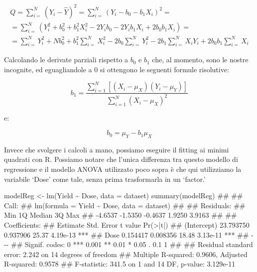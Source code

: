 \documentclass[a4paper,12pt,oneside]{book}
\newenvironment{Shaded}{\begin{snugshade}}{\end{snugshade}}
\newcommand{\SpecialCharTok}[1]{#1}
\newcommand{\DocumentationTok}[1]{#1}
\newcommand{\OtherTok}[1]{#1}
\newcommand{\FunctionTok}[1]{#1}
\newcommand{\AttributeTok}[1]{#1}
\newcommand{\NormalTok}[1]{#1}
\begin{document}
\[\begin{array}{l}
Q = \sum\limits_{i = }^N {\left( {{Y_i} - \hat Y} \right)^2 = \sum\limits_{i = }^N {{{\left( {{Y_i} - {b_0} - {b_1}{X_i}} \right)}^2}}  = } \\
 = \sum\limits_{i = }^N {\left( {Y_i^2 + b_0^2 + b_1^2X_i^2 - 2{Y_i}{b_0} - 2{Y_i}{b_1}{X_i} + 2{b_0}{b_1}{X_i}} \right)}  = \\
 = \sum\limits_{i = }^N {Y_i^2 + Nb_0^2 + b_1^2\sum\limits_{i = }^N {X_i^2 - 2{b_0}\sum\limits_{i = }^N {Y_i^2 - 2{b_1}\sum\limits_{i = }^N {{X_i}{Y_i} + } } } } 2{b_0}{b_1}\sum\limits_{i = }^N {{X_i}} 
\end{array}\]

Calcolando le derivate parziali rispetto a \(b_0\) e \(b_1\) che, al momento, sono le nostre incognite, ed eguagliandole a 0 si ottengono le seguenti formule risolutive:

\[{b_1} = \frac{{\sum\limits_{i = 1}^N {\left[ {\left( {{X_i} - {\mu _X}} \right)\left( {{Y_i} - {\mu _Y}} \right)} \right]} }}{{\sum\limits_{i = 1}^N {{{\left( {{X_i} - {\mu _X}} \right)}^2}} }}\]

e:

\[{b_0} = {\mu _Y} - {b_1}{\mu _X}\]

Invece che svolgere i calcoli a mano, possiamo eseguire il fitting ai minimi quadrati con R. Possiamo notare che l'unica differenza tra questo modello di regressione e il modello ANOVA utilizzato poco sopra è che qui utilizziamo la variabile `Dose' come tale, senza prima trasformarla in un `factor.'

\begin{Shaded}
\begin{Highlighting}[]
\NormalTok{modelReg }\OtherTok{\textless{}{-}} \FunctionTok{lm}\NormalTok{(Yield }\SpecialCharTok{\textasciitilde{}}\NormalTok{ Dose, }\AttributeTok{data =}\NormalTok{ dataset)}
\FunctionTok{summary}\NormalTok{(modelReg)}
\DocumentationTok{\#\# }
\DocumentationTok{\#\# Call:}
\DocumentationTok{\#\# lm(formula = Yield \textasciitilde{} Dose, data = dataset)}
\DocumentationTok{\#\# }
\DocumentationTok{\#\# Residuals:}
\DocumentationTok{\#\#     Min      1Q  Median      3Q     Max }
\DocumentationTok{\#\# {-}4.6537 {-}1.5350 {-}0.4637  1.9250  3.9163 }
\DocumentationTok{\#\# }
\DocumentationTok{\#\# Coefficients:}
\DocumentationTok{\#\#              Estimate Std. Error t value Pr(\textgreater{}|t|)    }
\DocumentationTok{\#\# (Intercept) 23.793750   0.937906   25.37 4.19e{-}13 ***}
\DocumentationTok{\#\# Dose         0.154417   0.008356   18.48 3.13e{-}11 ***}
\DocumentationTok{\#\# {-}{-}{-}}
\DocumentationTok{\#\# Signif. codes:  0 \textquotesingle{}***\textquotesingle{} 0.001 \textquotesingle{}**\textquotesingle{} 0.01 \textquotesingle{}*\textquotesingle{} 0.05 \textquotesingle{}.\textquotesingle{} 0.1 \textquotesingle{} \textquotesingle{} 1}
\DocumentationTok{\#\# }
\DocumentationTok{\#\# Residual standard error: 2.242 on 14 degrees of freedom}
\DocumentationTok{\#\# Multiple R{-}squared:  0.9606, Adjusted R{-}squared:  0.9578 }
\DocumentationTok{\#\# F{-}statistic: 341.5 on 1 and 14 DF,  p{-}value: 3.129e{-}11}
\end{Highlighting}
\end{Shaded}
\end{document}
